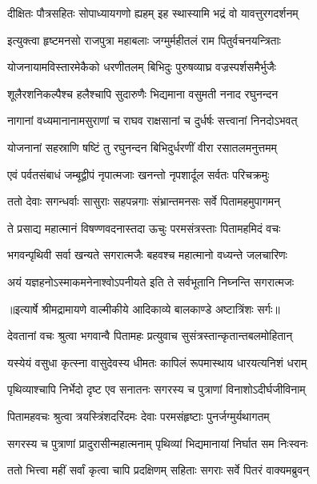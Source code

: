 \twolineshloka
{दीक्षितः पौत्रसहितः सोपाध्यायगणो ह्यहम्}
{इह स्थास्यामि भद्रं वो यावत्तुरगदर्शनम्} %

\twolineshloka
{इत्युक्त्वा हृष्टमनसो राजपुत्रा महाबलाः}
{जग्मुर्महीतलं राम पितुर्वचनयन्त्रिताः} %

\twolineshloka
{योजनायामविस्तारमेकैको धरणीतलम्}
{बिभिदुः पुरुषव्याघ्र वज्रस्पर्शसमैर्भुजैः} %

\twolineshloka
{शूलैरशनिकल्पैश्च हलैश्चापि सुदारुणैः}
{भिद्यमाना वसुमती ननाद रघुनन्दन} %

\twolineshloka
{नागानां वध्यमानानामसुराणां च राघव}
{राक्षसानां च दुर्धर्षः सत्त्वानां निनदोऽभवत्} %

\twolineshloka
{योजनानां सहस्राणि षष्टिं तु रघुनन्दन}
{बिभिदुर्धरणीं वीरा रसातलमनुत्तमम्} %

\twolineshloka
{एवं पर्वतसंबाधं जम्बूद्वीपं नृपात्मजाः}
{खनन्तो नृपशार्दूल सर्वतः परिचक्रमुः} %

\twolineshloka
{ततो देवाः सगन्धर्वाः सासुराः सहपन्नगाः}
{संभ्रान्तमनसः सर्वे पितामहमुपागमन्} %

\twolineshloka
{ते प्रसाद्य महात्मानं विषण्णवदनास्तदा}
{ऊचुः परमसंत्रस्ताः पितामहमिदं वचः} %

\twolineshloka
{भगवन्पृथिवी सर्वा खन्यते सगरात्मजैः}
{बहवश्च महात्मानो वध्यन्ते जलचारिणः} %

\twolineshloka
{अयं यज्ञहनोऽस्माकमनेनाश्वोऽपनीयते}
{इति ते सर्वभूतानि निघ्नन्ति सगरात्मजः} %


{॥इत्यार्षे श्रीमद्रामायणे वाल्मीकीये आदिकाव्ये बालकाण्डे अष्टात्रिंशः सर्गः॥}


\twolineshloka
{देवतानां वचः श्रुत्वा भगवान्वै पितामहः}
{प्रत्युवाच सुसंत्रस्तान्कृतान्तबलमोहितान्} %

\twolineshloka
{यस्येयं वसुधा कृत्स्ना वासुदेवस्य धीमतः}
{कापिलं रूपमास्थाय धारयत्यनिशं धराम्} %

\twolineshloka
{पृथिव्याश्चापि निर्भेदो दृष्ट एव सनातनः}
{सगरस्य च पुत्राणां विनाशोऽदीर्घजीविनाम्} %

\twolineshloka
{पितामहवचः श्रुत्वा त्रयस्त्रिंशदरिंदमः}
{देवाः परमसंहृष्टाः पुनर्जग्मुर्यथागतम्} %

\twolineshloka
{सगरस्य च पुत्राणां प्रादुरासीन्महात्मनाम्}
{पृथिव्यां भिद्यमानायां निर्घात सम निःस्वनः} %

\twolineshloka
{ततो भित्त्वा महीं सर्वां कृत्वा चापि प्रदक्षिणम्}
{सहिताः सगराः सर्वे पितरं वाक्यमब्रुवन्} %

